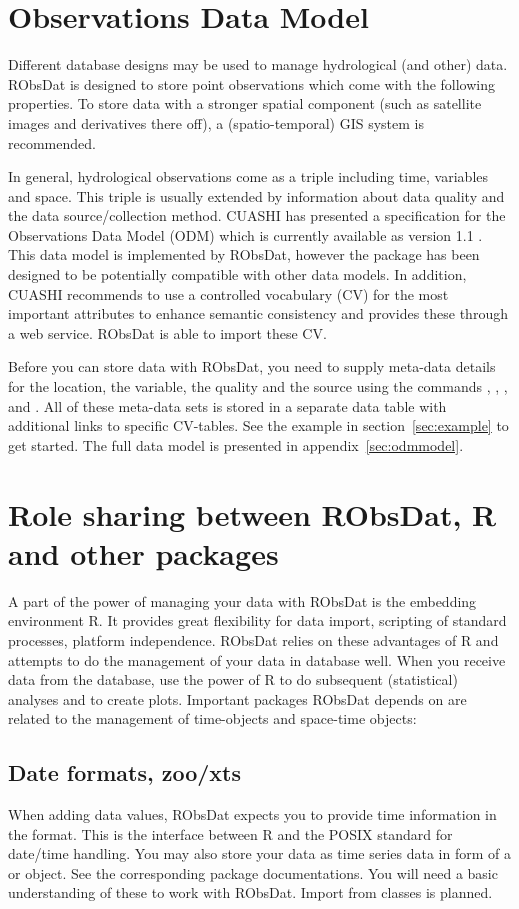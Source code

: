 \documentclass[a4paper]{article}
\begin{document}
\section{Observations Data Model}
\label{sec:odm}
Different database designs may be used to manage
hydrological (and other) data. RObsDat is designed
to store point observations which come with the
following properties. To store data with a
stronger spatial component (such as satellite
images and derivatives there off), a
(spatio-temporal) GIS system is recommended.

In general, hydrological observations come as a
triple including time, variables and space. This
triple is usually extended by information about
data quality and the data source/collection
method. CUASHI has presented a specification for
the Observations Data Model (ODM) which is
currently available as version 1.1
\citep{Tarboton2008}. 
This data model is
implemented by RObsDat, however the package has
been designed to be potentially compatible with other data
models. 
In addition, CUASHI recommends to use a
controlled vocabulary (CV) for the most important
attributes to enhance semantic consistency
and provides these through a web service. RObsDat
is able to import these CV.

Before you can store data with RObsDat, you need
to supply meta-data details for the location, the
variable, the quality and the source using the
commands \verb@addSite@, \verb@addVariable@,
\verb@addQualityControlLevel@, and \verb@addSource@. All
of these meta-data sets is stored in a separate
data table with additional links to specific
CV-tables. See the example in
section~\ref{sec:example} to get started.
The full data model is presented in
appendix~\ref{sec:odmmodel}.

\section{Role sharing between RObsDat, R and other packages}
A part of the power of managing your data with
RObsDat is the embedding environment R. It
provides great flexibility for data import,
scripting of standard processes, platform
independence. RObsDat relies on these advantages
of R and attempts to do the management of your
data in database well. When you receive data from
the database, use the power of R to do subsequent
(statistical) analyses and to create plots.
Important packages RObsDat depends on are related
to the management of time-objects and space-time
objects:
\label{sec:sharing}
\subsection{Date formats, zoo/xts}
When adding data values, RObsDat expects you to
provide time information in the \verb@POSIXct@
format. This is the interface between R and the
POSIX standard for date/time handling. You may
also store your data as time series data in form
of a \verb@zoo@ or \verb@xts@ object. See the
corresponding package documentations. You will need
a basic understanding of these to work with
RObsDat. Import from \verb@spacetime@ classes is
planned.
\end{document}
